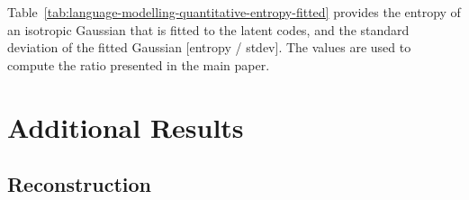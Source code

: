 \documentclass{article}
\begin{document}
Table\ \ref{tab:language-modelling-quantitative-entropy-fitted} provides the entropy of an isotropic Gaussian that is fitted to the latent codes, and the standard deviation of the fitted Gaussian [entropy / stdev]. The values are used to compute the ratio presented in the main paper.

\FloatBarrier


\section{Additional Results}



\subsection{Reconstruction}
\end{document}
